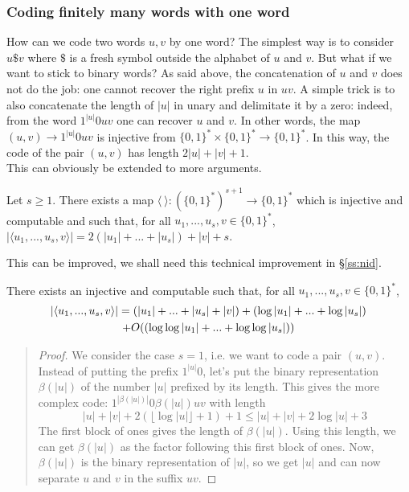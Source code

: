 \subsubsection{Coding finitely many words with one word}
\label{sss:codemany}
How can we code two words $u,v$ by one word?
The simplest way is to consider $u\$ v$ where $\$ $
is a fresh symbol outside the alphabet of $u$ and $v$.
But what if we want to stick to binary words?
As said above, the concatenation of $u$ and $v$ does not
do the job: one cannot recover the right prefix $u$ in $uv$.
A simple trick is to also concatenate the length of $|u|$ in
unary and delimitate it by a zero:
indeed, from the word $1^{|u|}0uv$ one can recover $u$ and $v$.
In other words, the map $(u,v)\to 1^{|u|}0uv$ is injective
from ${\{0,1\}^*}\times{\{0,1\}^*}\to{\{0,1\}^*}$.
In this way, the code of the pair $(u,v)$ has length $2|u|+|v|+1$.
\\
This can obviously be extended to more arguments.
\begin{proposition}\label{p:code}
Let $s\geq1$.
There exists a map
$\langle\ \rangle : ({\{0,1\}^*})^{s+1}\to{\{0,1\}^*}$
which is injective and computable and such that,
for all $u_1,...,u_s,v\in{\{0,1\}^*}$,
$|\langle u_1,...,u_s,v \rangle|
= 2(|u_1|+...+|u_s|)+|v|+ s$.
\end{proposition}
This can be improved, we shall need this technical improvement
in \S\ref{ss:nid}.
\begin{proposition}\label{p:codeloglog}
There exists an injective and computable such that,
for all $u_1,...,u_s,v\in{\{0,1\}^*}$,
\begin{multline*}
|\langle u_1,...,u_s,v \rangle|
= (|u_1|+...+|u_s|+|v|)
+ (\log|u_1|+...+\log|u_s|)\\
+ O((\log\log|u_1|+...+\log\log|u_s|))
$$
\end{multline*}
\end{proposition}

{\small\begin{quote}
\begin{proof}
We consider the case $s=1$, i.e. we want to code a pair $(u,v)$.
Instead of putting the prefix $1^{|u|}0$, let's put the binary
representation $\beta(|u|)$ of the number $|u|$ prefixed by
its length.
This gives the more complex code:
$1^{|\beta(|u|)|}0\beta(|u|)uv$
with length
$$
|u|+|v|+2(\lfloor\log|u|\rfloor+1)+1
\leq |u|+|v|+2\log|u| + 3
$$
The first block of ones gives the length of $\beta(|u|)$.
Using this length, we can get $\beta(|u|)$ as the factor following
this first block of ones.
Now, $\beta(|u|)$ is the binary representation of $|u|$, so we get
$|u|$ and can now separate $u$ and $v$ in the suffix $uv$.
\end{proof}
\end{quote}}
